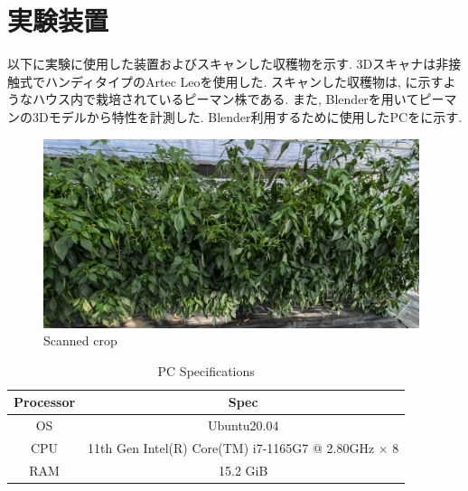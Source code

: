 \section{実験装置}
以下に実験に使用した装置およびスキャンした収穫物を示す.
3Dスキャナは非接触式でハンディタイプのArtec Leoを使用した.
スキャンした収穫物は, に示すようなハウス内で栽培されているピーマン株である.
また, Blenderを用いてピーマンの3Dモデルから特性を計測した.
Blender利用するために使用したPCをに示す.

\begin{figure}[H]
   \centering
   \includegraphics[width=110mm]{images/png/plant.png}
   \caption{Scanned crop}
   \label{Fig:plant}
\end{figure}

\begin{table}[H]
  \begin{center}
    \begin{tabular}{c|c}
      Processor & Spec\\ \hline\hline
      OS & Ubuntu20.04\\ \hline
      CPU & 11th Gen Intel(R) Core(TM) i7-1165G7 @ 2.80GHz × 8\\ \hline
      RAM & 15.2 GiB\\ \hline
    \end{tabular}
    \caption{PC Specifications}
    \label{Tab:pc}
  \end{center}
\end{table}